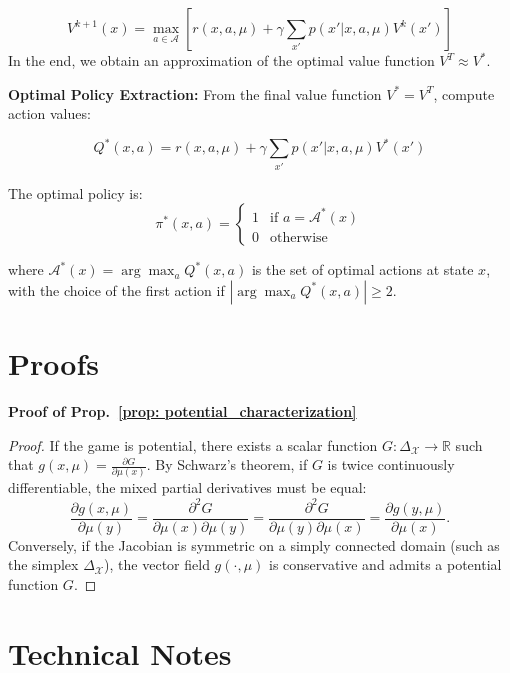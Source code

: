\documentclass[10pt,twocolumn,letterpaper]{article}
\theoremstyle{definition}
\theoremstyle{remark}
\newcommand{\states}{\mathcal{X}}
\newcommand{\actions}{\mathcal{A}}
\begin{document}
\begin{equation}
V^{k+1}(x) = \max_{a \in \actions} \left[ r(x, a, \mu) + \gamma \sum_{x'} p(x'|x, a, \mu) V^k\left(x'\right) \right]
\end{equation}
In the end, we obtain an approximation of the optimal value function $V^{T}\approx V^*$.

\textbf{Optimal Policy Extraction:}
From the final value function $V^* = V^{T}$, compute action values:

\begin{equation}
Q^*(x, a) = r(x, a, \mu) + \gamma \sum_{x'} p(x'|x, a, \mu) V^*\left(x'\right)
\end{equation}

The optimal policy is:
\begin{equation}
\pi^*(x, a) = \begin{cases} 
1 & \text{if } a = \actions^*(x) \\
0 & \text{otherwise}
\end{cases}
\end{equation}

where $\actions^*(x) = \arg\max_{a} Q^*(x, a)$ is the set of optimal actions at state $x$, with the choice of the first action if $|\arg\max_{a} Q^*(x, a)|\ge2$.

\newpage
\section{Proofs}
\textbf{Proof of Prop.~\ref{prop: potential_characterization}}\label{proof: potential_characterization}
\begin{proof}
    If the game is potential, there exists a scalar function $G: \Delta_{\states} \to \mathbb R$ such that $g(x, \mu) = \frac{\partial G}{\partial \mu(x)}$. By Schwarz's theorem, if $G$ is twice continuously differentiable, the mixed partial derivatives must be equal:
    \[
        \frac{\partial g(x, \mu)}{\partial \mu(y)} = \frac{\partial^2 G}{\partial \mu(x) \partial \mu(y)} = \frac{\partial^2 G}{\partial \mu(y) \partial \mu(x)} = \frac{\partial g(y, \mu)}{\partial \mu(x)}.
    \]
    Conversely, if the Jacobian is symmetric on a simply connected domain (such as the simplex $\Delta_{\states}$), the vector field $g(\cdot, \mu)$ is conservative and admits a potential function $G$.
\end{proof}






\section{Technical Notes}
\end{document}

